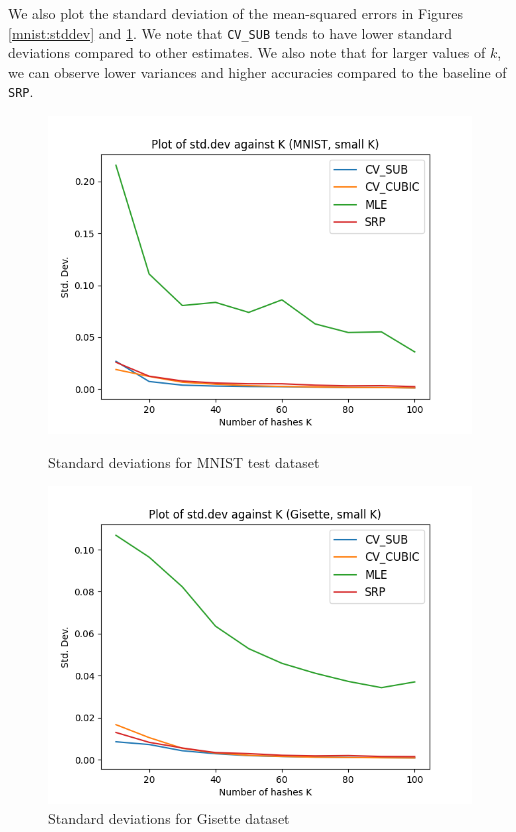 \documentclass[runningheads]{llncs}
\begin{document}
    We also plot the standard deviation of the mean-squared errors in Figures \ref{mnist:stddev} and \ref{gisette:stddev}. We note that \verb|CV_SUB| tends to have lower standard deviations compared to other estimates. We also note that for larger values of $k$, we can observe lower variances and higher accuracies compared to the baseline of \verb|SRP|.  
      \begin{figure}
        \centering
        \begin{minipage}{.45\columnwidth}
            \centering
            \includegraphics[width=\textwidth]{images/mnist_normal_stddev.png}
            \caption{Standard deviations for MNIST test dataset}
            \label{mnist:stddev}
        \end{minipage}
        \hfill
        \begin{minipage}{.45\columnwidth}
            \centering
            \includegraphics[width=\textwidth]{images/gisette_normal_stddev.png}
            \caption{Standard deviations for Gisette dataset}
            \label{gisette:stddev}
        \end{minipage}
    \end{figure}
\end{document}
